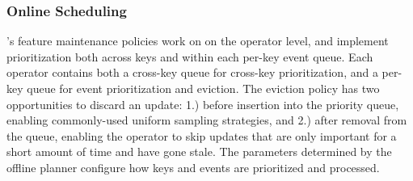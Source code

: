 %

%
\subsubsection{Online Scheduling}
\label{ss:design:operator-level-scheduler}
%
\system{}'s feature maintenance policies work on on the operator level, and implement prioritization both across keys and within each per-key event queue.  
%
Each operator contains both a cross-key queue for cross-key prioritization, and a per-key queue for event prioritization and eviction. 
The eviction policy has two opportunities to discard an update:
1.) before insertion into the priority queue, enabling
commonly-used uniform sampling strategies, and
2.) after removal from the queue, enabling the operator
to skip updates that are only important for a short amount of
time and have gone stale.
%
The parameters determined by the offline planner configure how keys and events are prioritized and processed. 
%


